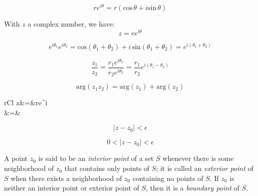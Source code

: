 \documentclass[nobib,notoc]{tufte-handout}
\begin{document}
\begin{thm}
	\begin{equation*}
		re^{i\theta}=r(\text{cos}\,\theta+i\text{sin}\,\theta)
	\end{equation*}
\end{thm}
\begin{cor}
	With \(z\) a complex number, we have:
	\begin{equation*}
		z=re^{i\theta}
	\end{equation*}
\end{cor}
\begin{ident}
	\begin{equation*}
		e^{i\theta_1}e^{i\theta_2}=\text{cos}(\theta_1+\theta_2)+i\,\text{sin}(\theta_1+\theta_2)=e^{i(\theta_1+\theta_2)}
	\end{equation*}
\end{ident}
\begin{ident}
	\begin{equation*}
		\frac{z_1}{z_2}=\frac{r_1e^{i\theta_1}}{r_2e^{i\theta_2}}=\frac{r_1}{r_2}e^{i(\theta_1-\theta_2)}
	\end{equation*}
\end{ident}
\begin{ident}
	\begin{equation*}
		\text{arg}(z_1z_2)=\text{arg}(z_1)+\text{arg}(z_2)
	\end{equation*}
\end{ident}
\begin{ident}
	\begin{IEEEeqnarray*}{rCl}
		z&=&re^{i\theta}\\
		&=&\,
	\end{IEEEeqnarray*}
\end{ident}
\begin{defi}
	\begin{equation*}
		\lvert z-z_0\rvert<\epsilon
	\end{equation*}
\end{defi}
\begin{defi}
	\begin{equation*}
		0<\lvert z-z_0\rvert <\epsilon
	\end{equation*}
\end{defi}
\begin{defi}
	A point \(z_0\) is said to be an \emph{interior point} of a set \(S\) whenever there is some neighborhood of \(z_0\) that contains only points of \(S\); it is called an \emph{exterior point}  of \(S\) when there exists a neighborhood of \(z_0\) containing no points of \(S\). If \(z_0\) is neither an interior point or exterior point of \(S\), then it is a \emph{boundary point} of \(S\).
\end{defi}
\end{document}
